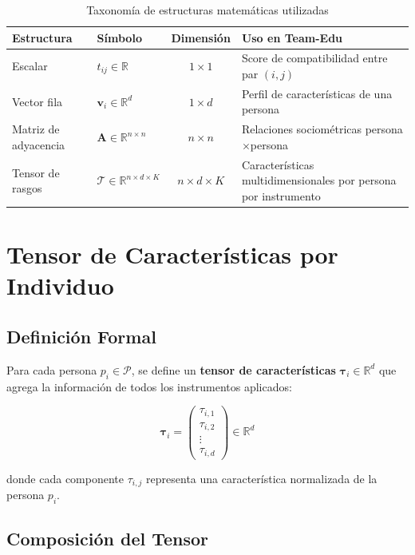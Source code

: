 \documentclass[12pt,a4paper]{article}
\begin{document}
\begin{table}[h]
\centering
\begin{tabular}{llcp{5.5cm}}
\toprule
\textbf{Estructura} & \textbf{Símbolo} & \textbf{Dimensión} & \textbf{Uso en Team-Edu} \\
\midrule
Escalar & $t_{ij} \in \mathbb{R}$ & $1 \times 1$ & Score de compatibilidad entre par $(i,j)$ \\
Vector fila & $\mathbf{v}_i \in \mathbb{R}^d$ & $1 \times d$ & Perfil de características de una persona \\
Matriz de adyacencia & $\mathbf{A} \in \mathbb{R}^{n \times n}$ & $n \times n$ & Relaciones sociométricas persona$\times$persona \\
Tensor de rasgos & $\boldsymbol{\mathcal{T}} \in \mathbb{R}^{n \times d \times K}$ & $n \times d \times K$ & Características multidimensionales por persona por instrumento \\
\bottomrule
\end{tabular}
\caption{Taxonomía de estructuras matemáticas utilizadas}
\end{table}

\section{Tensor de Características por Individuo}
\label{sec:tensor}

\subsection{Definición Formal}

Para cada persona $p_i \in \mathcal{P}$, se define un \textbf{tensor de características} $\boldsymbol{\tau}_i \in \mathbb{R}^{d}$ que agrega la información de todos los instrumentos aplicados:

\[
\boldsymbol{\tau}_i = \begin{pmatrix} \tau_{i,1} \\ \tau_{i,2} \\ \vdots \\ \tau_{i,d} \end{pmatrix} \in \mathbb{R}^{d}
\]

donde cada componente $\tau_{i,j}$ representa una característica normalizada de la persona $p_i$.

\subsection{Composición del Tensor}
\end{document}

